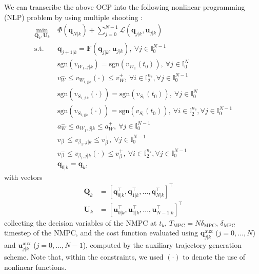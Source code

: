 We can transcribe the above OCP into the following nonlinear programming (NLP)
problem by using multiple shooting \cite{Bock1984MultipleShooting}:
\begin{equation*}
    \begin{aligned}
        \min_{\bm{Q}_k, \bm{U}_k} \;
            & \Phi(\bm{q}_{N|k}) + \sum_{j=0}^{N-1} \mathcal{L}(\bm{q}_{j|k}, \bm{u}_{j|k}) \\
            \text{s.t. } & \bm{q}_{j+1|k} = \bm{F}(\bm{q}_{j|k}, \bm{u}_{j|k}),\: \forall j \in \mathbb{I}_0^{N-1} \\
                         & \mathrm{sgn}(v_{W_1,j|k}) = \mathrm{sgn}(v_{W_1}(t_0)),\: \forall j \in \mathbb{I}_0^N \\
                         & v_W^- \le v_{W_{i,j|k}}(\cdot) \le v_W^+,\: \forall i \in \mathbb{I}_2^{n_s}, \forall j \in \mathbb{I}_0^{N-1} \\
                         & \mathrm{sgn}(v_{S_{1,j|k}}(\cdot)) = \mathrm{sgn}(v_{S_1}(t_0)),\: \forall j \in \mathbb{I}_0^N \\
                         & \mathrm{sgn}(v_{S_{i,j|k}}(\cdot)) = \mathrm{sgn}(v_{S_i}(t_0)),\: \forall i \in \mathbb{I}_2^{n_s}, \forall j \in \mathbb{I}_0^{N-1} \\
                         & a_W^- \le a_{W_1,j|k} \le a_W^+,\: \forall j \in \mathbb{I}_0^{N-1} \\
                         & v_{\beta}^- \le v_{\beta_1,j|k} \le v_{\beta}^+,\: \forall j \in \mathbb{I}_0^{N-1} \\
                         & v_{\beta}^- \le v_{\beta_i,j|k}(\cdot) \le v_{\beta}^+,\: \forall i \in \mathbb{I}_2^{n_s}, \forall j \in \mathbb{I}_0^{N-1} \\
                         & \bm{q}_{0|k} = \bm{q}_k,
    \end{aligned}
\end{equation*}
with vectors
\begin{align*}
\bm{Q}_k &= \left[\bm{q}_{0|k}^\top, \bm{q}_{1|k}^\top, \dots, \bm{q}_{N|k}^\top\right]^\top \\
\bm{U}_k &= \left[\bm{u}_{0|k}^\top, \bm{u}_{1|k}^\top, \dots, \bm{u}_{N-1|k}^\top\right]^\top
\end{align*}
collecting the decision variables of the NMPC at $t_k$,
$T_{\mathrm{MPC}}=N\delta_{\mathrm{MPC}}$, $\delta_{\mathrm{MPC}}$ timestep of
the NMPC, and the cost function evaluated using
$\bm{q}_{j|k}^{\mathrm{aux}}$ ($j = 0, \dots, N$) and
$\bm{u}_{j|k}^{\mathrm{aux}}$ ($j = 0, \dots, N - 1$), computed by the auxiliary
trajectory generation scheme. Note that, within the constraints, we used
$(\cdot)$ to denote the use of nonlinear functions.

